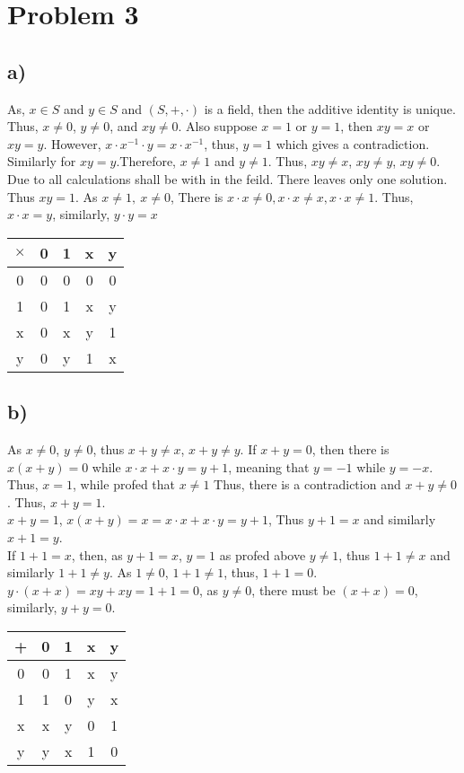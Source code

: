 \documentclass{article}
\begin{document}
\section*{Problem 3}
\subsection*{a)}
As, \(x\in S\) and \(y \in S\) and \((S,+,\cdot)\) is a field, then the additive identity is unique.
Thus, \(x\neq 0\), \(y\neq 0\), and \(xy\neq 0\). Also suppose \(x=1\) or \(y=1\), then \(xy=x\) or \(xy=y\).
However, \(x\cdot x^{-1}\cdot y = x\cdot x^{-1}\), thus, \(y=1\) which gives a contradiction. Similarly for \(xy=y\).Therefore, \(x\neq1\) and \(y\neq 1\).
Thus, \(xy\neq x\), \(xy\neq y\), \(xy\neq 0\). Due to all calculations shall be with in the feild. There leaves only one solution. Thus
\(xy = 1\). As \(x\neq1,\ x\neq 0\), There is \(x\cdot x \neq 0, x\cdot x \neq x, x\cdot x \neq 1\). Thus, \(x\cdot x = y\), similarly, \(y\cdot y = x\)

\begin{table*}[h]
    \centering
    \begin{tabular}{|c|c|c|c|c|}
        \hline
        \(\times\)&0&1&x&y\\ \hline
        0&0&0&0&0\\ \hline
        1&0&1&x&y\\ \hline
        x&0&x&y&1\\ \hline
        y&0&y&1&x\\ \hline
    \end{tabular}
\end{table*}
\subsection*{b)}
As \(x\neq 0\), \(y\neq 0\), thus \(x+y\neq x\), \(x+y\neq y\). If \(x+y=0\), then there is
\(x(x+y)=0\) while \(x\cdot x + x\cdot y = y+1\), meaning that \(y=-1\) while \(y=-x\). Thus, \(x=1\), while profed that \(x\neq 1\)
Thus, there is a contradiction and \(x+y\neq 0\). Thus, \(x+y=1\).\\
\(x+y=1\), \(x(x+y)=x=x\cdot x + x\cdot y = y+1\), Thus \(y+1=x\) and similarly \( x+1 = y\).\\
If \(1+1 = x\), then, as \(y+1=x\), \(y=1\) as profed above \(y\neq1\), thus \(1+1\neq x\) and similarly \(1+1\neq y\). As \(1\neq 0\), \(1+1\neq 1\),
thus, \(1+1=0\).\\
\(y\cdot(x+x)=xy+xy=1+1=0\), as \(y\neq0\), there must be \((x+x)=0\), similarly, \(y+y=0\).
\begin{table*}[h]
    \centering
    \begin{tabular}{|c|c|c|c|c|}
        \hline
        +&0&1&x&y\\ \hline
        0&0&1&x&y\\ \hline
        1&1&0&y&x\\ \hline
        x&x&y&0&1\\ \hline
        y&y&x&1&0\\ \hline
    \end{tabular}
\end{table*}
\end{document}
